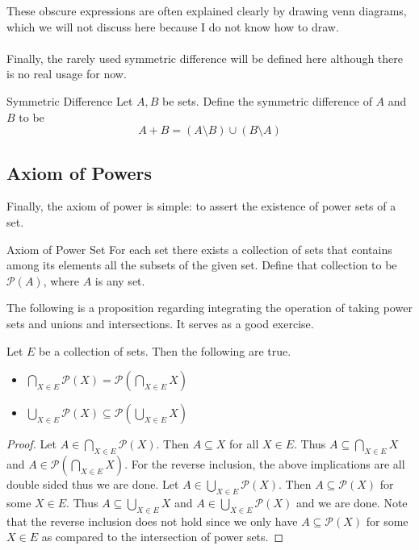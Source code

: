 \documentclass[a4paper]{article}
\begin{document}
These obscure expressions are often explained clearly by drawing venn diagrams, which we will not discuss here because I do not know how to draw. \\~\\

Finally, the rarely used symmetric difference will be defined here although there is no real usage for now. 

\begin{defn}{Symmetric Difference}{} Let $A,B$ be sets. Define the symmetric difference of $A$ and $B$ to be $$A+B=(A\setminus B)\cup(B\setminus A)$$
\end{defn}

\subsection{Axiom of Powers}
Finally, the axiom of power is simple: to assert the existence of power sets of a set. 

\begin{axm}{Axiom of Power Set}{} For each set there exists a collection of sets that contains among its elements all the subsets of the given set. Define that collection to be $\mathcal{P}(A)$, where $A$ is any set. 
\end{axm}

The following is a proposition regarding integrating the operation of taking power sets and unions and intersections. It serves as a good exercise. 

\begin{prp}{}{} Let $E$ be a collection of sets. Then the following are true. 
\begin{itemize}
\item $\bigcap_{X\in E}\mathcal{P}(X)=\mathcal{P}(\bigcap_{X\in E}X)$
\item $\bigcup_{X\in E}\mathcal{P}(X)\subseteq\mathcal{P}(\bigcup_{X\in E}X)$
\end{itemize}\tcbline
\begin{proof}
Let $A\in\bigcap_{X\in E}\mathcal{P}(X)$. Then $A\subseteq X$ for all $X\in E$. Thus $A\subseteq\bigcap_{X\in E}X$ and $A\in\mathcal{P}(\bigcap_{X\in E}X)$. For the reverse inclusion, the above implications are all double sided thus we are done. \linebreak\linebreak
Let $A\in\bigcup_{X\in E}\mathcal{P}(X)$. Then $A\subseteq\mathcal{P}(X)$ for some $X\in E$. Thus $A\subseteq\bigcup_{X\in E}X$ and $A\in\bigcup_{X\in E}\mathcal{P}(X)$ and we are done. Note that the reverse inclusion does not hold since we only have $A\subseteq\mathcal{P}(X)$ for some $X\in E$ as compared to the intersection of power sets. 
\end{proof}
\end{prp}
\end{document}
